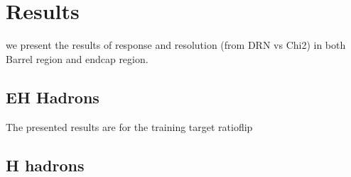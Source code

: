 \section{Results}
we present the results of response and resolution (from DRN vs Chi2) in  both Barrel region and endcap region.

\subsection{EH Hadrons}
The presented results are for the training target ratioflip

\usepackage{lscape}
\begin{landscape}  

\end{landscape}





\subsection{H hadrons}





